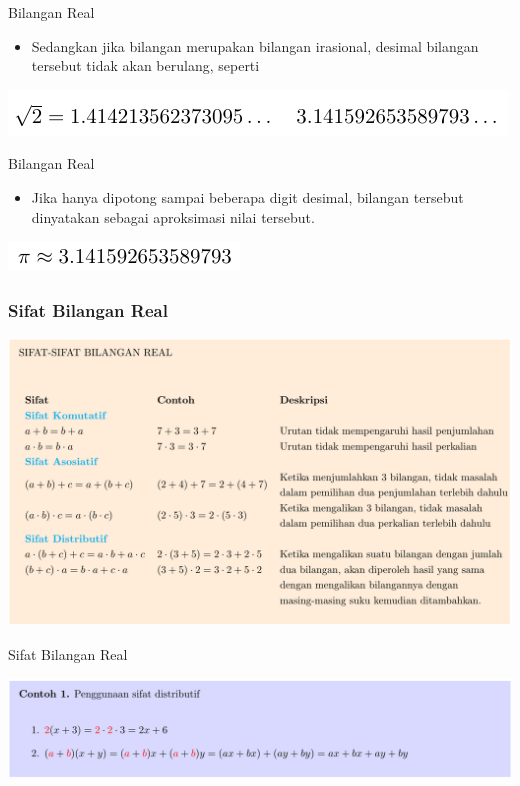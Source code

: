 \documentclass[pdflatex,compress,mathserif]{beamer}
\begin{document}
\begin{frame}{Bilangan Real}
	\begin{itemize}
		\item Sedangkan jika bilangan merupakan bilangan irasional, desimal bilangan tersebut tidak akan berulang, seperti
	\end{itemize}
	\begin{center}
		\includegraphics[width=0.7\linewidth]{img/img03}
	\end{center}
\end{frame}

\begin{frame}{Bilangan Real}
	\begin{itemize}
		\item Jika hanya dipotong sampai beberapa digit desimal, bilangan tersebut dinyatakan sebagai aproksimasi nilai tersebut.
	\end{itemize}
	\begin{center}
		\includegraphics[width=0.4\linewidth]{img/img04}
	\end{center}
\end{frame}

\begin{frame}
	\frametitle{Sifat Bilangan Real}
	\begin{center}
		\includegraphics[width=\linewidth]{img/img05}
	\end{center}
\end{frame}

\begin{frame}{Sifat Bilangan Real}
	\begin{center}
		\includegraphics[width=\linewidth]{img/img06}
	\end{center}
\end{frame}
\end{document}
